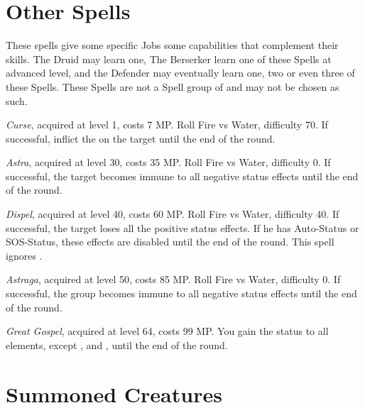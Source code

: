 \section{Other Spells}\label{sec:magic-other}
\begin{multicols}{2}

    These spells give some specific Jobs some capabilities that complement their skills. The Druid may learn one, The Berserker learn one of these Spells at advanced level, and the Defender may eventually learn one, two or even three of these Spells. These Spells are not a Spell group of and may not be chosen as such.
    
    \textit{Curse}, acquired at level 1, costs 7 MP\@. Roll Fire vs Water, difficulty 70. If successful, inflict the  on the target until the end of the round.

    \textit{Astra}, acquired at level 30, costs 35 MP\@. Roll Fire vs Water, difficulty 0. If successful, the target becomes immune to all negative status effects until the end of the round.
    
    \textit{Dispel}, acquired at level 40, costs 60 MP\@. Roll Fire vs Water, difficulty 40. If successful, the target loses all the positive status effects. If he has Auto-Status or SOS-Status, these effects are disabled until the end of the round. This spell ignores .
    
    \textit{Astraga}, acquired at level 50, costs 85 MP\@. Roll Fire vs Water, difficulty 0. If successful, the group becomes immune to all negative status effects until the end of the round.
    
    \textit{Great Gospel}, acquired at level 64, costs 99 MP\@. You gain the  status to all elements, except ,  and , until the end of the round.	

\end{multicols}

\section{Summoned Creatures}\label{sec:magic-summoned}

